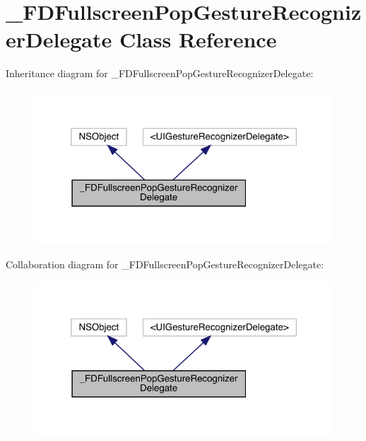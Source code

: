 \hypertarget{interface___f_d_fullscreen_pop_gesture_recognizer_delegate}{}\section{\+\_\+\+F\+D\+Fullscreen\+Pop\+Gesture\+Recognizer\+Delegate Class Reference}
\label{interface___f_d_fullscreen_pop_gesture_recognizer_delegate}


Inheritance diagram for \+\_\+\+F\+D\+Fullscreen\+Pop\+Gesture\+Recognizer\+Delegate\+:\nopagebreak
\begin{figure}[H]
\begin{center}
\leavevmode
\includegraphics[width=320pt]{interface___f_d_fullscreen_pop_gesture_recognizer_delegate__inherit__graph}
\end{center}
\end{figure}


Collaboration diagram for \+\_\+\+F\+D\+Fullscreen\+Pop\+Gesture\+Recognizer\+Delegate\+:\nopagebreak
\begin{figure}[H]
\begin{center}
\leavevmode
\includegraphics[width=320pt]{interface___f_d_fullscreen_pop_gesture_recognizer_delegate__coll__graph}
\end{center}
\end{figure}

